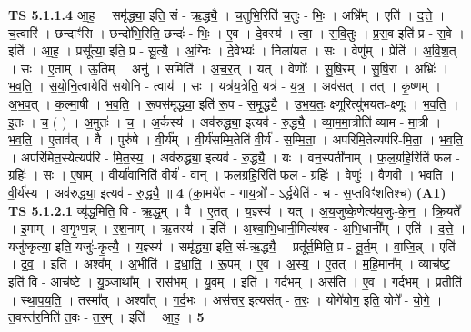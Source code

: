 \documentclass[17pt]{extarticle}
\begin{document}
                  \newline
                                \textbf{ TS 5.1.1.4} \newline
                  आ॒ह॒ । समृ॑द्ध्या॒ इति॒ सं - ऋ॒द्ध्यै॒ । च॒तुभि॒रिति॑ च॒तुः - भिः॒ । अभ्रि᳚म् । एति॑ । द॒त्ते॒ । च॒त्वारि॑ । छन्दाꣳ॑सि । छन्दो॑भि॒रिति॒ छन्दः॑ - भिः॒ । ए॒व । दे॒वस्य॑ । त्वा॒ । स॒वि॒तुः । प्र॒स॒व इति॑ प्र - स॒वे । इति॑ । आ॒ह॒ । प्रसू᳚त्या॒ इति॒ प्र - सू॒त्यै॒ । अ॒ग्निः । दे॒वेभ्यः॑ । निला॑यत । सः । वेणु᳚म् । प्रेति॑ । अ॒वि॒श॒त् । सः । ए॒ताम् । ऊ॒तिम् । अनु॑ । समिति॑ । अ॒च॒र॒त् । यत् । वेणोः᳚ । सु॒षि॒रम् । सु॒षि॒रा । अभ्रिः॑ । भ॒व॒ति॒ । स॒यो॒नि॒त्वायेति॑ सयोनि - त्वाय॑ । सः । यत्र॑य॒त्रेति॒ यत्र॑ - य॒त्र॒ । अव॑सत् । तत् । कृ॒ष्णम् । अ॒भ॒व॒त् । क॒ल्मा॒षी । भ॒व॒ति॒ । रू॒पस॑मृद्ध्या॒ इति॑ रू॒प - स॒मृ॒द्ध्यै॒ । उ॒भ॒य॒तः॒ क्ष्णूरित्यु॑भयतः-क्ष्णूः । भ॒व॒ति॒ । इ॒तः । च॒ ( ) । अ॒मुतः॑ । च॒ । अ॒र्कस्य॑ । अव॑रुद्ध्या॒ इत्यव॑ - रु॒द्ध्यै॒ । व्या॒म॒मा॒त्रीति॑ व्याम - मा॒त्री । भ॒व॒ति॒ । ए॒ताव॑त् । वै । पुरु॑षे । वी॒र्य᳚म् । वी॒र्य॑सम्मि॒तेति॑ वी॒र्य॑ - स॒म्मि॒ता॒ । अप॑रिमि॒तेत्यप॑रि-मि॒ता॒ । भ॒व॒ति॒ । अप॑रिमित॒स्येत्यप॑रि - मि॒त॒स्य॒ । अव॑रुद्ध्या॒ इत्यव॑ - रु॒द्ध्यै॒ । यः । वन॒स्पती॑नाम् । फ॒ल॒ग्रहि॒रिति॑ फल - ग्रहिः॑ । सः । ए॒षा॒म् । वी॒र्या॑वा॒निति॑ वी॒र्य॑ - वा॒न् । फ॒ल॒ग्रहि॒रिति॑ फल - ग्रहिः॑ । वेणुः॑ । वै॒ण॒वी । भ॒व॒ति॒ । वी॒र्य॑स्य । अव॑रुद्ध्या॒ इत्यव॑ - रु॒द्ध्यै॒ ॥ \textbf{  4} \newline
                  \newline
                      (का॒मये॑त - गाय॒त्रो᳚ - ऽर्द्ध॒येति॑ - च - स॒प्तविꣳ॑शतिश्च)  \textbf{(A1)} \newline \newline
                                \textbf{ TS 5.1.2.1} \newline
                  व्यृ॑द्ध॒मिति॒ वि - ऋ॒द्ध॒म् । वै । ए॒तत् । य॒ज्ञ्स्य॑ । यत् । अ॒य॒जुष्के॒णेत्य॑य॒जुः-के॒न॒ । क्रि॒यते᳚ । इ॒माम् । अ॒गृ॒भ्ण॒न्न् । र॒श॒नाम् । ऋ॒तस्य॑ । इति॑ । अ॒श्वा॒भि॒धानी॒मित्य॑श्व - अ॒भि॒धानी᳚म् । एति॑ । द॒त्ते॒ । यजु॑ष्कृत्या॒ इति॒ यजुः॑-कृ॒त्यै॒ । य॒ज्ञ्स्य॑ । समृ॑द्ध्या॒ इति॒ सं-ऋ॒द्ध्यै॒ । प्रतू᳚र्त॒मिति॒ प्र - तू॒र्त॒म् । वा॒जि॒न्न् । एति॑ । द्र॒व॒ । इति॑ । अश्व᳚म् । अ॒भीति॑ । द॒धा॒ति॒ । रू॒पम् । ए॒व । अ॒स्य॒ । ए॒तत् । म॒हि॒मान᳚म् । व्याच॑ष्ट॒ इति॑ वि - आच॑ष्टे । यु॒ञ्जाथा᳚म् । रास॑भम् । यु॒वम् । इति॑ । ग॒र्द॒भम् । अस॑ति । ए॒व । ग॒र्द॒भम् । प्रतीति॑ । स्था॒प॒य॒ति॒ । तस्मा᳚त् । अश्वा᳚त् । ग॒र्द॒भः । अस॑त्तर॒ इत्यस॑त् - त॒रः॒ । योगे॑योग॒ इति॒ योगे᳚ - यो॒गे॒ । त॒वस्त॑र॒मिति॑ त॒वः - त॒र॒म् । इति॑ । आ॒ह॒ । \textbf{  5} \newline
                  \newline
\end{document}
